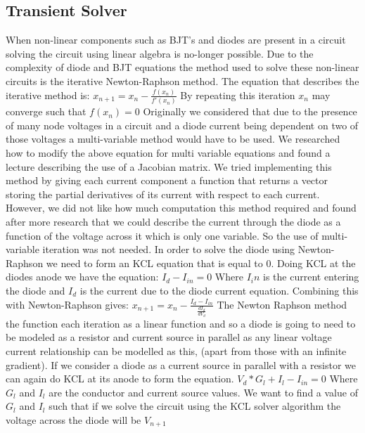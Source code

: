 \documentclass{article}
\begin{document}
\subsection{Transient Solver}\label{ssec:TransientSolver}
When non-linear components such as BJT's and diodes are present in a circuit solving the circuit using linear algebra is no-longer possible. Due to the complexity of diode and BJT equations the method used to solve these non-linear circuits is the iterative Newton-Raphson method. The equation that describes the iterative method is:
\bigbreak $x_{n+1} = x_n - \frac{f(x_n)}{f'(x_n)}$\bigbreak
By repeating this iteration $x_n$ may converge such that $f(x_n) = 0$
Originally we considered that due to the presence of many node voltages in a circuit and a diode current being dependent on two of those voltages a multi-variable method would have to be used. We researched how to modify the above equation for multi variable equations and found a lecture\cite{mulitvariableNR} describing the use of a Jacobian matrix. We tried implementing this method by giving each current component a function that returns a vector storing the partial derivatives of its current with respect to each current. However, we did not like how much computation this method required and found after more research\cite{NewtonRaphson} that we could describe the current through the diode as a function of the voltage across it which is only one variable\cite{LinearCompanionModels}. So the use of multi-variable iteration was not needed. In order to solve the diode using Newton-Raphson we need to form an KCL equation that is equal to 0. Doing KCL at the diodes anode we have the equation:
\bigbreak $I_d - I_{in} = 0$\bigbreak
Where $I_in$ is the current entering the diode and $I_d$ is the current due to the diode current equation. Combining this with Newton-Raphson gives:
\bigbreak $x_{n+1} = x_n - \frac{I_d - I_{in}}{\frac{d I_d}{d V_d}}$\bigbreak
The Newton Raphson method the function each iteration as a linear function and so a diode is going to need to be modeled as a resistor and current source in parallel as any linear voltage current relationship can be modelled as this, (apart from those with an infinite gradient). If we consider a diode as a current source in parallel with a resistor we can again do KCL at its anode to form the equation. 
\bigbreak $V_d*G_l + I_l - I_{in} = 0$ Where $G_l$ and $I_l$ are the conductor and current source values.\bigbreak
We want to find a value of $G_l$ and $I_l$ such that if we solve the circuit using the KCL solver algorithm the voltage across the diode will be $V_{n+1}$
\end{document}
